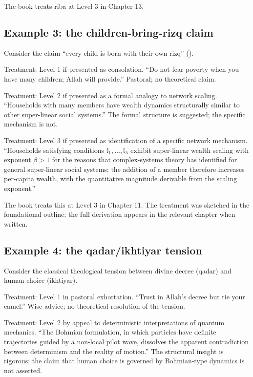 The book treats riba at Level 3 in Chapter 13.

\subsection{Example 3: the children-bring-rizq claim}

Consider the claim ``every child is born with their own rizq''
().

Treatment: Level 1 if presented as consolation. ``Do not fear
poverty when you have many children; Allah will provide.'' Pastoral;
no theoretical claim.

Treatment: Level 2 if presented as a formal analogy to network
scaling. ``Households with many members have wealth dynamics
structurally similar to other super-linear social systems.'' The
formal structure is suggested; the specific mechanism is not.

Treatment: Level 3 if presented as identification of a specific
network mechanism. ``Households satisfying conditions
$\mathbb{I}_1, \dots, \mathbb{I}_5$ exhibit super-linear wealth
scaling with exponent $\beta > 1$ for the reasons that complex-systems
theory has identified for general super-linear social systems; the
addition of a member therefore increases per-capita wealth, with the
quantitative magnitude derivable from the scaling exponent.''

The book treats this at Level 3 in Chapter 11. The treatment was
sketched in the foundational outline; the full derivation appears in
the relevant chapter when written.

\subsection{Example 4: the qadar/ikhtiyar tension}

Consider the classical theological tension between divine decree
(qadar) and human choice (ikhtiyar).

Treatment: Level 1 in pastoral exhortation. ``Trust in Allah's
decree but tie your camel.'' Wise advice; no theoretical resolution
of the tension.

Treatment: Level 2 by appeal to deterministic interpretations of
quantum mechanics. ``The Bohmian formulation, in which particles have
definite trajectories guided by a non-local pilot wave, dissolves the
apparent contradiction between determinism and the reality of
motion.'' The structural insight is rigorous; the claim that human
choice is governed by Bohmian-type dynamics is not asserted.

